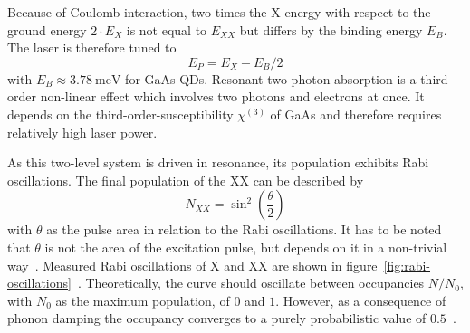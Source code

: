 Because of Coulomb interaction, two times the \ac{X} energy with respect to the ground energy $2 \cdot E_X$ is not equal to $E_{XX}$ but differs by the binding energy $E_B$.
The laser is therefore tuned to
\begin{equation}
\label{eq:e_p}
E_P = E_X - E_B / 2
\end{equation}
with $E_B \approx \SI{3.78}{\milli \electronvolt}$ for GaAs \acp{QD}.
Resonant two-photon absorption is a third-order non-linear effect which involves two photons and electrons at once.
It depends on the third-order-susceptibility $\chi^{(3)}$ of GaAs and therefore requires relatively high laser power.

As this two-level system is driven in resonance, its population exhibits Rabi oscillations.
The final population of the \ac{XX} can be described by
\begin{equation}
\label{eq:n-xx}
N_{XX} = \sin^2\left(\frac{\theta}{2}\right)
\end{equation}
with $\theta$ as the pulse area in relation to the Rabi oscillations.
It has to be noted that $\theta$ is not the area of the excitation pulse, but depends on it in a non-trivial way~\cite{stufler_two-photon_2006}.
Measured Rabi oscillations of \ac{X} and \ac{XX} are shown in figure~\ref{fig:rabi-oscillations}~\cite{reindl_phonon-assisted_2017}.
Theoretically, the curve should oscillate between occupancies $N/N_0$, with $N_0$ as the maximum population, of $0$ and $1$.
However, as a consequence of phonon damping the occupancy converges to a purely probabilistic value of $0.5$~\cite{forstner_phonon-assisted_2003}.
